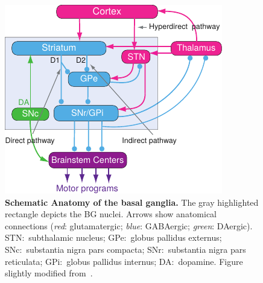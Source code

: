 \begin{figure}[bth]
	\begin{center}
		\includegraphics[width=0.7\linewidth]{ch-intro/figures/BGAnatomy}
		\caption[Anatomy of the Basal Ganglia]
		{\textbf{Schematic Anatomy of the basal ganglia.}
		The gray highlighted rectangle depicts the BG nuclei.
		Arrows show anatomical connections (\textit{red}: glutamatergic; \textit{blue}: GABAergic; \textit{green}: DAergic).
		STN:~subthalamic nucleus;
		GPe:~globus pallidus externus;
		SNc:~substantia nigra pars compacta;
		SNr:~substantia nigra pars reticulata;
		GPi:~globus pallidus internus;
		DA:~dopamine.
		Figure slightly modified from~\cite{Grillner2016BG}.
		}
		\label{fig:intro:BGAnatomy}
	\end{center}
\end{figure}